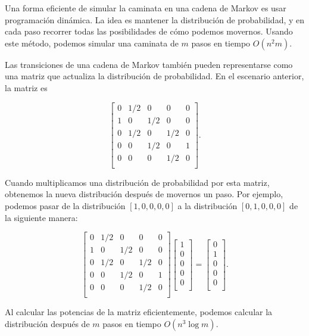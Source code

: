 Una forma eficiente de simular la caminata en
una cadena de Markov es usar programación dinámica.
La idea es mantener la distribución de probabilidad,
y en cada paso recorrer todas las posibilidades
de cómo podemos movernos.
Usando este método, podemos simular
una caminata de $m$ pasos en tiempo $O(n^2 m)$.

Las transiciones de una cadena de Markov también pueden
representarse como una matriz que actualiza la
distribución de probabilidad.
En el escenario anterior, la matriz es

\[
 \begin{bmatrix}
  0 & 1/2 & 0 & 0 & 0 \\
  1 & 0 & 1/2 & 0 & 0 \\
  0 & 1/2 & 0 & 1/2 & 0 \\
  0 & 0 & 1/2 & 0 & 1 \\
  0 & 0 & 0 & 1/2 & 0 \\
 \end{bmatrix}.
\]

Cuando multiplicamos una distribución de probabilidad por esta matriz,
obtenemos la nueva distribución después de movernos un paso.
Por ejemplo, podemos pasar de la distribución
$[1,0,0,0,0]$ a la distribución
$[0,1,0,0,0]$ de la siguiente manera:

\[
 \begin{bmatrix}
  0 & 1/2 & 0 & 0 & 0 \\
  1 & 0 & 1/2 & 0 & 0 \\
  0 & 1/2 & 0 & 1/2 & 0 \\
  0 & 0 & 1/2 & 0 & 1 \\
  0 & 0 & 0 & 1/2 & 0 \\
 \end{bmatrix}
 \begin{bmatrix}
  1 \\
  0 \\
  0 \\
  0 \\
  0 \\
 \end{bmatrix}
=
 \begin{bmatrix}
  0 \\
  1 \\
  0 \\
  0 \\
  0 \\
 \end{bmatrix}.
\]

Al calcular las potencias de la matriz eficientemente,
podemos calcular la distribución después de $m$ pasos
en tiempo $O(n^3 \log m)$.

